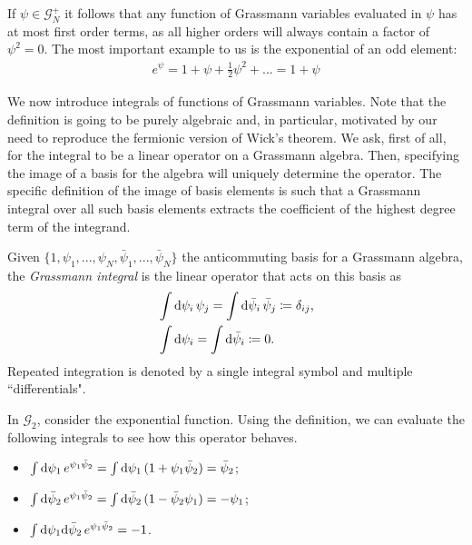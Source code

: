 \begin{remark}
	If $\psi \in \mathcal{G}_N^{+}$ it follows that any function of Grassmann variables evaluated
	in $\psi$ has at most first order terms, as all higher orders will always contain a factor
	of $\psi^2 = 0$. The most important example to us is the exponential of an odd element:
	\begin{align*}
		e^{\psi} = 1 + \psi + \frac{1}{2}\psi^2 + ... = 1 + \psi
	\end{align*}
\end{remark}

We now introduce integrals of functions of Grassmann variables. Note that the definition is
going to be purely algebraic and, in particular, motivated by our need to reproduce the
fermionic version of Wick's theorem. We ask, first of all, for the integral to be a linear
operator on a Grassmann algebra. Then, specifying the image of a basis for the algebra will
uniquely determine the operator. The specific definition of the image of basis elements is
such that a Grassmann integral over all such basis elements extracts the coefficient of the
highest degree term of the integrand.
\begin{definition}
	Given $\{1, \psi_1, ..., \psi_N, \bar\psi_1, ..., \bar\psi_N\}$ the anticommuting basis
	for a Grassmann algebra, the \textit{Grassmann integral} is the linear operator that acts
	on this basis as
	\begin{align*}
		&\int\mathrm{d}\psi_i\,\psi_j = \int\mathrm{d}\bar\psi_i\,\bar\psi_j \coloneq \delta_{ij}, \\
		&\int\mathrm{d}\psi_i = \int\mathrm{d}\bar\psi_i \coloneq 0.
	\end{align*}
	Repeated integration is denoted by a single integral symbol and multiple ``differentials".
\end{definition}

\begin{example}
	In $\mathcal{G}_2$, consider the exponential function. Using the definition, we can
	evaluate the following integrals to see how this operator behaves.
	\begin{itemize}
		\item $\int\mathrm{d}\psi_1\,e^{\psi_1\bar\psi_2} = \int\mathrm{d}\psi_1\,(1 + \psi_1\bar\psi_2) = \bar\psi_2$;
		\item $\int\mathrm{d}\bar\psi_2\,e^{\psi_1\bar\psi_2} = \int\mathrm{d}\bar\psi_2\,(1 - \bar\psi_2\psi_1) = -\psi_1$;
		\item $\int\mathrm{d}\psi_1\mathrm{d}\bar\psi_2\,e^{\psi_1\bar\psi_2} = -1$.
	\end{itemize}
\end{example}

